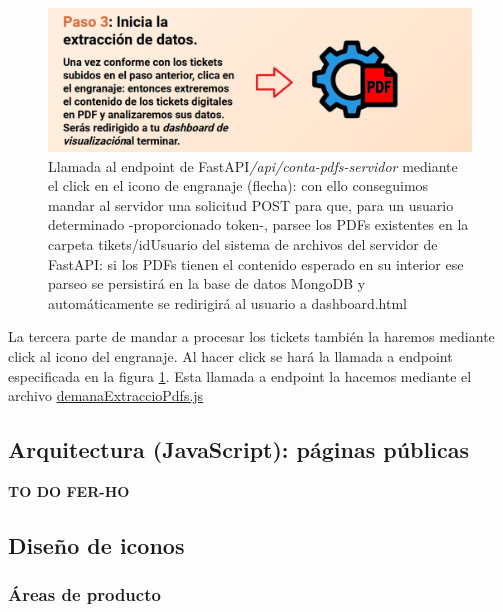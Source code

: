 \documentclass[a4paper,12pt]{report}
\begin{document}
	
	
	\begin{figure}[H]
		\centering
		\caption{Llamada al endpoint de FastAPI\textit{/api/conta-pdfs-servidor} mediante el click en el icono de engranaje (flecha): con ello conseguimos mandar al servidor una solicitud POST para que, para un usuario determinado -proporcionado token-, parsee los PDFs existentes en la carpeta tikets/idUsuario del sistema de archivos del servidor de FastAPI: si los PDFs tienen el contenido esperado en su interior ese parseo se persistirá en la base de datos MongoDB y automáticamente se redirigirá al usuario a dashboard.html}
		\includegraphics[width=1\linewidth]{img/part3pas4engranatge}

		\label{fig:part3pas4engranatge}
	\end{figure}
	
	La tercera parte de mandar a procesar los tickets también la haremos mediante click al icono del engranaje. Al hacer click se hará la llamada a endpoint especificada en la figura \ref{fig:part3pas4engranatge}. Esta llamada a endpoint la hacemos mediante el archivo \href{https://github.com/blackcub3s/mercApp/blob/main/APP%20WEB/__frontend__produccio__/app/js/pas4/demanaExtraccioPdfs.js}{demanaExtraccioPdfs.js}
	
		
	\subsection{Arquitectura (JavaScript): páginas públicas}
	\label{sec:arquitecturaPaginesPubliques}
	
	\textbf{TO DO FER-HO}
	
	
	\subsection{Diseño de iconos}
	
	\subsubsection{Áreas de producto}
	
\end{document}
